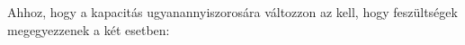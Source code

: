 \begin{enumerate}[label=\alph*),itemsep=0pt]
   Ahhoz, hogy a kapacitás ugyanannyiszorosára változzon az kell, hogy feszültségek megegyezzenek a két esetben:
 \end{enumerate}

\fi